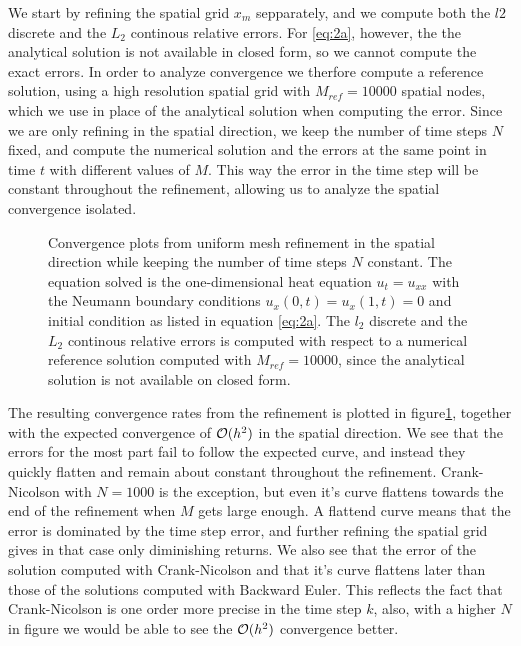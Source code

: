 We start by refining the spatial grid $x_m$ sepparately, 
and we compute both the $l2$ discrete and the $L_2$ continous relative errors. 
For \eqref{eq:2a}, however, the the analytical solution is not available in closed form, 
so we cannot compute the exact errors. 
In order to analyze convergence we therfore compute a reference solution, 
using a high resolution spatial grid with $M_{ref}=10000$ spatial nodes, 
which we use in place of the analytical solution when computing the error. 
Since we are only refining in the spatial direction, 
we keep the number of time steps $N$ fixed, 
and compute the numerical solution and the errors at the same point in time $t$ with different values of $M$. 
This way the error in the time step will be constant throughout the refinement, 
allowing us to analyze the spatial convergence isolated. 
\begin{figure}[ht]
    \centering
    
    \label{fig:2a-convergence}
    \caption{
        Convergence plots from uniform mesh refinement 
        in the spatial direction while keeping the number of time steps $N$ constant. 
        The equation solved is the one-dimensional heat equation $u_t=u_{xx}$ 
        with the Neumann boundary conditions $u_x(0,t) = u_x(1,t)=0$ and initial condition 
        as listed in equation \eqref{eq:2a}. 
        The $l_2$ discrete and the $L_2$ continous relative errors is computed 
        with respect to a numerical reference solution computed with $M_{ref}=10000$, 
        since the analytical solution is not available on closed form. 
    }
\end{figure}

The resulting convergence rates from the refinement is plotted in figure\ref{fig:2a-convergence}, 
together with the expected convergence of $\mathcal{O}(h^2)$ in the spatial direction. 
We see that the errors for the most part fail to follow the expected curve, 
and instead they quickly flatten and remain about constant throughout the refinement. 
Crank-Nicolson with $N=1000$ is the exception, 
but even it's curve flattens towards the end of the refinement when $M$ gets large enough. 
A flattend curve means that the error is dominated by the time step error, 
and further refining the spatial grid gives in that case only diminishing returns. 
We also see that the error of the solution computed with Crank-Nicolson and that it's curve flattens later than those of the solutions computed with Backward Euler. 
This reflects the fact that Crank-Nicolson is one order more precise in the time step $k$, 
also, 
with a higher $N$ in figure we would be able to see the $\mathcal{O}(h^2)$ convergence better. 

